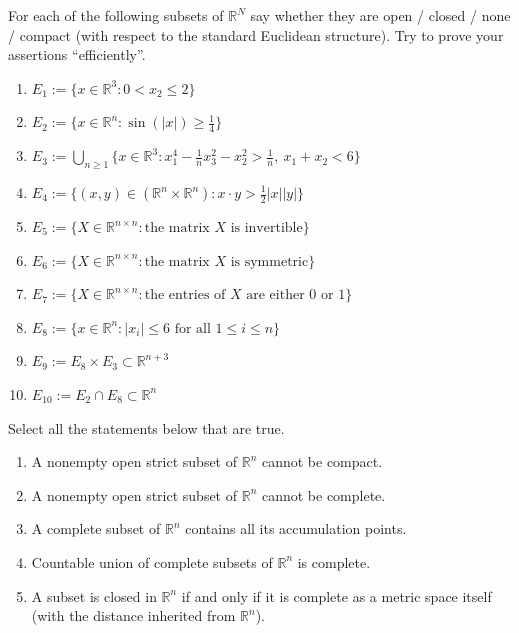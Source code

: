 \begin{exercise}
\label{ex:open_closed_complete_compact}
For each of the following subsets of $\mathbb{R}^N$ say whether they are open / closed / none /
compact (with respect to the standard Euclidean structure). Try to prove your assertions
``efficiently''.
\begin{enumerate}[label=\textbf{(\alph*)}]
  \item $E_1 := \{x \in \mathbb{R}^3 : 0 < x_2 \leq 2\}$
  \item $E_2 := \{x \in \mathbb{R}^n : \sin(|x|) \geq \tfrac{1}{4}\}$
  \item $E_3 := \bigcup_{n \geq 1}\{x \in \mathbb{R}^3 : x_1^4 - \tfrac{1}{n}x_3^2 - x_2^2 > \tfrac{1}{n},\ x_1 + x_2 < 6\}$
  \item $E_4 := \{(x,y) \in (\mathbb{R}^n \times \mathbb{R}^n) : x \cdot y > \tfrac{1}{2}|x||y|\}$
  \item $E_5 := \{X \in \mathbb{R}^{n\times n} : \text{the matrix } X \text{ is invertible}\}$
  \item $E_6 := \{X \in \mathbb{R}^{n\times n} : \text{the matrix } X \text{ is symmetric}\}$
  \item $E_7 := \{X \in \mathbb{R}^{n\times n} : \text{the entries of } X \text{ are either } 0 \text{ or } 1\}$
  \item $E_8 := \{x \in \mathbb{R}^n : |x_i| \leq 6 \text{ for all } 1 \leq i \leq n\}$
  \item $E_9 := E_8 \times E_3 \subset \mathbb{R}^{n+3}$
  \item $E_{10} := E_2 \cap E_8 \subset \mathbb{R}^n$
\end{enumerate}
\end{exercise}


\begin{exercise}
\label{ex:open_complete_compact_multiple_choice}
Select all the statements below that are true.
\begin{enumerate}[label=\textbf{(\alph*)}]
  \item A nonempty open strict subset of $\mathbb{R}^n$ cannot be compact.
  \item A nonempty open strict subset of $\mathbb{R}^n$ cannot be complete.
  \item A complete subset of $\mathbb{R}^n$ contains all its accumulation points.
  \item Countable union of complete subsets of $\mathbb{R}^n$ is complete.
  \item A subset is closed in $\mathbb{R}^n$ if and only if it is complete as a metric space
    itself (with the distance inherited from $\mathbb{R}^n$).
\end{enumerate}
\end{exercise}

